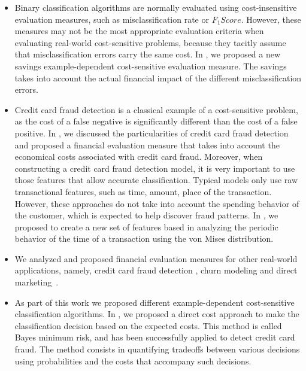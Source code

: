 \begin{itemize}

\item 
  Binary classification algorithms are normally evaluated using cost-insensitive 
  evaluation measures, such as misclassification rate or \mbox{$F_1Score$}. However, these 
  measures may not be the most appropriate evaluation criteria when  evaluating  
  real-world cost-sensitive problems, because they tacitly assume that 
  misclassification errors carry the same cost. In \citep{CorreaBahnsen2013}, we proposed a new 
  savings example-dependent cost-sensitive evaluation measure. The savings takes into 
  account the actual financial impact of the different misclassification errors.
  
\item 
  Credit card fraud detection is a classical example of a cost-sensitive problem, as the cost of a 
  false negative is significantly different than the cost of a false positive. In 
  \citep{CorreaBahnsen2013,CorreaBahnsen2014}, we discussed the particularities of credit card 
  fraud detection and proposed a financial evaluation measure that takes into account the 
  economical costs associated with credit card fraud. Moreover, when constructing a credit card 
  fraud detection model, it is very important to use those features that allow accurate 
  classification. Typical models only use raw transactional features, such as time, amount, place 
  of the transaction. However, these approaches do not take into account the spending
  behavior of the customer, which is expected to help discover fraud patterns. In 
  \cite{CorreaBahnsen2015c,CorreaBahnsen2015d}, we proposed to create a new set of features based in
  analyzing the periodic behavior of the time of a transaction using the von Mises distribution.
  
\item
  We analyzed and proposed financial evaluation measures for other real-world applications, 
namely, credit card fraud detection \citep{CorreaBahnsen2014b}, churn modeling 
\citep{CorreaBahnsen2015a} and direct marketing~\citep{CorreaBahnsen2014}.

\item
  As part of this work we proposed different example-dependent cost-sensitive
  classification algorithms. In \citep{CorreaBahnsen2013,CorreaBahnsen2014}, we 
  proposed a direct cost approach to make the classification decision based on the expected costs. 
  This method is called Bayes minimum risk, and has been successfully applied to detect credit 
  card fraud. The method consists in quantifying tradeoffs between various decisions using 
  probabilities and the costs that accompany such decisions. 
  

\end{itemize}
